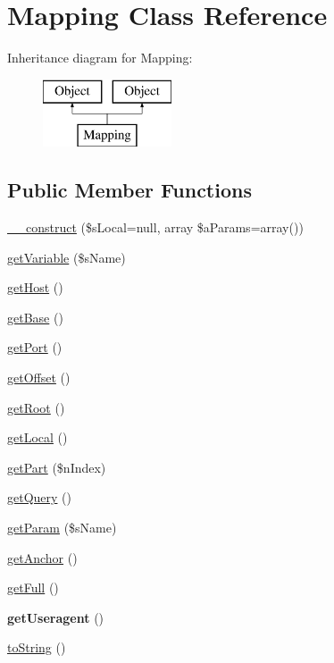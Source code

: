 \hypertarget{class_mapping}{\section{Mapping Class Reference}
\label{class_mapping}
}
Inheritance diagram for Mapping\-:\begin{figure}[H]
\begin{center}
\leavevmode
\includegraphics[height=2.000000cm]{class_mapping}
\end{center}
\end{figure}
\subsection*{Public Member Functions}
\begin{DoxyCompactItemize}
\item 
\hyperlink{class_mapping_ab6d98c2c453723581b019a9f53b240c6}{\-\_\-\-\_\-construct} (\$s\-Local=null, array \$a\-Params=array())
\item 
\hyperlink{class_mapping_a6cfcd7801cc9fd38ca515e73ef0c773b}{get\-Variable} (\$s\-Name)
\item 
\hyperlink{class_mapping_ac71836f63ab6a062bd737dd6749ab66f}{get\-Host} ()
\item 
\hyperlink{class_mapping_a50608963662f354e84ae95c6ffc69af5}{get\-Base} ()
\item 
\hyperlink{class_mapping_ab9a871b557d9612028065737252c4214}{get\-Port} ()
\item 
\hyperlink{class_mapping_a04d794284036472eccbc099fc28c62ab}{get\-Offset} ()
\item 
\hyperlink{class_mapping_af8d55dc2d96fa8837ef244fbc12ffc6a}{get\-Root} ()
\item 
\hyperlink{class_mapping_a339b33ea0f2cf278e739a19830ba7d82}{get\-Local} ()
\item 
\hyperlink{class_mapping_a915d647cb54784ab65b7b6d5a3be1aee}{get\-Part} (\$n\-Index)
\item 
\hyperlink{class_mapping_a15fdb50b851ad8f39e1fea4e962226de}{get\-Query} ()
\item 
\hyperlink{class_mapping_a4469b01f18836e2468bca0dfff8da521}{get\-Param} (\$s\-Name)
\item 
\hyperlink{class_mapping_a507dcd8523c560db8abed233f91aabaa}{get\-Anchor} ()
\item 
\hyperlink{class_mapping_a53413e6e5d618c7d781d3020cac1d8d5}{get\-Full} ()
\item 
\hypertarget{class_mapping_a45417c12799202166a2aaf92da822b89}{{\bfseries get\-Useragent} ()}\label{class_mapping_a45417c12799202166a2aaf92da822b89}

\item 
\hyperlink{class_mapping_ad209954974195306ae2d70cdbb81fb1a}{to\-String} ()
\end{DoxyCompactItemize}
